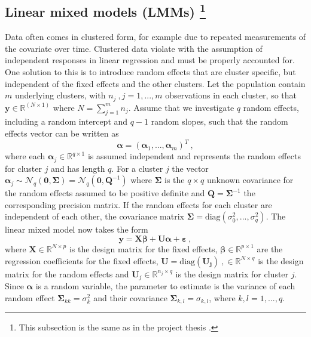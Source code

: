 \subsection{Linear mixed models (LMMs) \protect\footnote{This subsection is the same as in the project thesis \citep{Arnstad}.}}
\label{sec:LMM}
Data often comes in clustered form, for example due to repeated measurements of the covariate over time. 
Clustered data violate with the assumption of independent responses in linear regression and must be properly accounted for. One solution to this is to introduce random effects that are cluster specific, but independent of the fixed effects and the other clusters. Let the population contain $m$ underlying clusters, with $n_j\ , j=1, ..., m$ observations in each cluster, so that $\mathbf{y} \in \mathbb{R}^{(N \times 1)}$ where $N = \sum_{j=1}^m n_j $. Assume that we investigate $q$ random effects, including a random intercept and $q-1$ random slopes, such that the random effects vector can be written as 
\begin{equation}
    \label{eq:alpha}
    \boldsymbol{\alpha} = (\boldsymbol{\alpha}_1, ..., \boldsymbol{\alpha}_{m})^T \ ,
\end{equation}
where each $\boldsymbol{\alpha}_j \in \mathbb{R}^{q \times 1}$ is assumed independent and represents the random effects for cluster $j$ and has length $q$. For a cluster $j$ the vector $\boldsymbol{\alpha}_j \sim \mathcal{N}_q(\mathbf{0}, \mathbf{\Sigma})=\mathcal{N}_q(\mathbf{0}, \mathbf{Q}^{-1})$ where $\mathbf{\Sigma}$ is the $q \times q$ unknown covariance for the random effects assumed to be positive definite and $\mathbf{Q} = \mathbf{\Sigma}^{-1}$ the corresponding precision matrix. 
If the random effects for each cluster are independent of each other, the covariance matrix $\mathbf{\Sigma} = \text{diag}(\sigma_0^2, ..., \sigma_q^2)$.
The linear mixed model now takes the form
\begin{equation} \label{eq:LMM}
    \mathbf{y} = \mathbf{X}\boldsymbol{\beta} + \mathbf{U}\boldsymbol{\alpha} + \boldsymbol{\varepsilon} \ ,
\end{equation}
where $\mathbf{X} \in \mathbb{R}^{N \times p}$ is the design matrix for the fixed effects, $\boldsymbol{\beta} \in \mathbb{R}^{p \times 1}$ are the regression coefficients for the fixed effects, $\mathbf{U} = \text{diag}(\mathbf{U_j}) \ , \in \mathbb{R}^{N \times q}$ is the design matrix for the random effects and $\mathbf{U}_j \in \mathbb{R}^{n_j \times q}$ is the design matrix for cluster $j$. 
Since $\boldsymbol{\alpha}$ is a random variable, the parameter to estimate is the variance of each random effect $\mathbf{\Sigma}_{kk}=\sigma_k^2$ and their covariance $\mathbf{\Sigma}_{k, l} = \sigma_{k, l}$, where $k, l =1, ..., q$.
